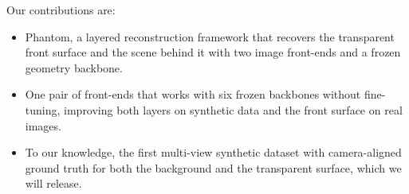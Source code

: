 Our contributions are:
\begin{itemize}
    \item Phantom, a layered reconstruction framework that recovers the transparent front surface and the scene behind it with two image front-ends and a frozen geometry backbone.
    \item One pair of front-ends that works with six frozen backbones without fine-tuning, improving both layers on synthetic data and the front surface on real images.
    \item To our knowledge, the first multi-view synthetic dataset with camera-aligned ground truth for both the background and the transparent surface, which we will release.
\end{itemize}
